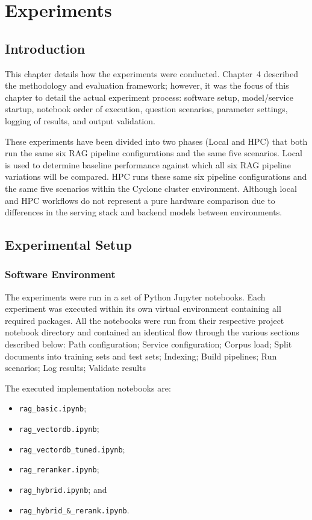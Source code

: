 \chapter{Experiments}

\section{Introduction}

This chapter details how the experiments were conducted. Chapter~4 described the methodology and evaluation framework; however, it was the focus of this chapter to detail the actual experiment process: software setup, model/service startup, notebook order of execution, question scenarios, parameter settings, logging of results, and output validation.

These experiments have been divided into two phases (Local and HPC) that both run the same six \ac{RAG} pipeline configurations and the same five scenarios. Local is used to determine baseline performance against which all six \ac{RAG} pipeline variations will be compared. \ac{HPC} runs these same six pipeline configurations and the same five scenarios within the Cyclone cluster environment. Although local and HPC workflows do not represent a pure hardware comparison due to differences in the serving stack and backend models between environments.

\section{Experimental Setup}

\subsection{Software Environment}

The experiments were run in a set of Python Jupyter notebooks. Each experiment was executed within its own virtual environment containing all required packages. All the notebooks were run from their respective project notebook directory and contained an identical flow through the various sections described below: Path configuration; Service configuration; Corpus load; Split documents into training sets and test sets; Indexing; Build pipelines; Run scenarios; Log results; Validate results

The executed implementation notebooks are:

\begin{itemize}
    \item \texttt{rag\_\allowbreak basic.ipynb};
    \item \texttt{rag\_\allowbreak vectordb.ipynb};
    \item \texttt{rag\_\allowbreak vectordb\_\allowbreak tuned.ipynb};
    \item \texttt{rag\_\allowbreak reranker.ipynb};
    \item \texttt{rag\_\allowbreak hybrid.ipynb}; and
    \item \texttt{rag\_\allowbreak hybrid\_\&\_\allowbreak rerank.ipynb}.
\end{itemize}

